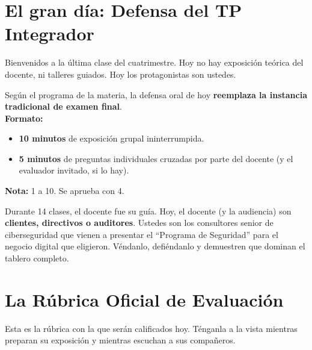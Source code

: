 \documentclass[12pt,a4paper]{article}
\begin{document}
\tableofcontents
\newpage

\section{El gran d\'ia: Defensa del TP Integrador}

Bienvenidos a la \'ultima clase del cuatrimestre. Hoy no hay exposici\'on te\'orica del docente, ni talleres guiados. Hoy los protagonistas son ustedes. 

\begin{cajaExamen}[title={Esta clase reemplaza el examen final}]
Seg\'un el programa de la materia, la defensa oral de hoy \textbf{reemplaza la instancia tradicional de examen final}.\\[4pt]
\textbf{Formato:}
\begin{itemize}[leftmargin=2em]
    \item \textbf{10 minutos} de exposici\'on grupal ininterrumpida.
    \item \textbf{5 minutos} de preguntas individuales cruzadas por parte del docente (y el evaluador invitado, si lo hay).
\end{itemize}
\textbf{Nota:} 1 a 10. Se aprueba con 4.
\end{cajaExamen}

\begin{cajaNota}[title={El cambio de rol}]
Durante 14 clases, el docente fue su gu\'ia. Hoy, el docente (y la audiencia) son \textbf{clientes, directivos o auditores}. Ustedes son los consultores senior de ciberseguridad que vienen a presentar el ``Programa de Seguridad'' para el negocio digital que eligieron. V\'endanlo, defi\'endanlo y demuestren que dominan el tablero completo.
\end{cajaNota}

\newpage
\section{La R\'ubrica Oficial de Evaluaci\'on}

Esta es la r\'ubrica con la que ser\'an calificados hoy. T\'enganla a la vista mientras preparan su exposici\'on y mientras escuchan a sus compa\~neros.
\end{document}
